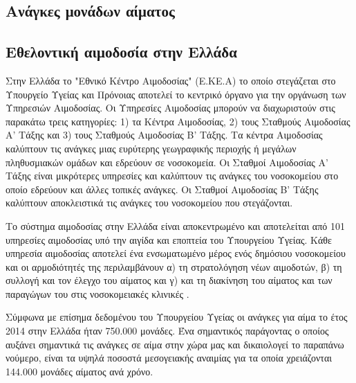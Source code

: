 	\subsection{Ανάγκες μονάδων αίματος}		
	\subsection{Εθελοντική αιμοδοσία στην Ελλάδα}
		Στην Ελλάδα το "Εθνικό Κέντρο Αιμοδοσίας" (Ε.ΚΕ.Α) το οποίο στεγάζεται στο Υπουργείο Υγείας και Πρόνοιας αποτελεί το κεντρικό όργανο για την οργάνωση των Υπηρεσιών Αιμοδοσίας. Οι Υπηρεσίες Αιμοδοσίας μπορούν να διαχωριστούν στις παρακάτω τρεις κατηγορίες: 1) τα Κέντρα Αιμοδοσίας, 2) τους Σταθμούς Αιμοδοσίας Α' Τάξης και 3) τους Σταθμούς Αιμοδοσίας Β' Τάξης. Τα κέντρα Αιμοδοσίας καλύπτουν τις ανάγκες μιας ευρύτερης γεωγραφικής περιοχής ή μεγάλων πληθυσμιακών ομάδων και εδρεύουν σε νοσοκομεία. Οι Σταθμοί Αιμοδοσίας Α' Τάξης είναι μικρότερες υπηρεσίες και καλύπτουν τις ανάγκες του νοσοκομείου στο οποίο εδρεύουν και άλλες τοπικές ανάγκες. Οι Σταθμοί Αιμοδοσίας Β' Τάξης καλύπτουν αποκλειστικά τις ανάγκες του νοσοκομείου που στεγάζονται.
		
		Το σύστημα αιμοδοσίας στην Ελλάδα είναι αποκεντρωμένο και αποτελείται από 101 υπηρεσίες αιμοδοσίας υπό την αιγίδα και εποπτεία του Υπουργείου Υγείας\cite{filloKivernisews}. Κάθε υπηρεσία αιμοδοσίας αποτελεί ένα ενσωματωμένο μέρος ενός δημόσιου νοσοκομείου και οι αρμοδιότητές της περιλαμβάνουν α) τη στρατολόγηση νέων αιμοδοτών, β) τη συλλογή και τον έλεγχο του αίματος και γ) και τη διακίνηση του αίματος και των παραγώγων του στις νοσοκομειακές κλινικές \cite{Marantidou2007}.
		
		Σύμφωνα με επίσημα δεδομένου του Υπουργείου Υγείας οι ανάγκες για αίμα το έτος 2014 στην Ελλάδα ήταν 750.000 μονάδες. Ένα σημαντικός παράγοντας ο οποίος αυξάνει σημαντικά τις ανάγκες σε αίμα στην χώρα μας και δικαιολογεί το παραπάνω νούμερο, είναι τα υψηλά ποσοστά μεσογειακής αναιμίας για τα οποία χρειάζονται 144.000 μονάδες αίματος ανά χρόνο. 
		
